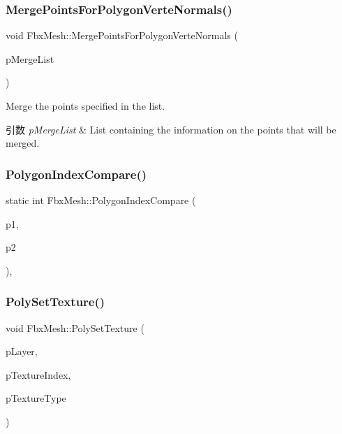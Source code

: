 \subsubsection{\texorpdfstring{Merge\+Points\+For\+Polygon\+Verte\+Normals()}{MergePointsForPolygonVerteNormals()}}
{\footnotesize\ttfamily void Fbx\+Mesh\+::\+Merge\+Points\+For\+Polygon\+Verte\+Normals (\begin{DoxyParamCaption}\item[{\hyperlink{class_fbx_array}{Fbx\+Array}$<$ int $>$ \&}]{p\+Merge\+List }\end{DoxyParamCaption})}

Merge the points specified in the list. 
\begin{DoxyParams}{引数}
{\em p\+Merge\+List} & List containing the information on the points that will be merged. \\
\hline
\end{DoxyParams}
\mbox{\label{class_fbx_mesh_acbc149091e1be99e9555abbd81f03981}} 
\subsubsection{\texorpdfstring{Polygon\+Index\+Compare()}{PolygonIndexCompare()}}
{\footnotesize\ttfamily static int Fbx\+Mesh\+::\+Polygon\+Index\+Compare (\begin{DoxyParamCaption}\item[{const void $\ast$}]{p1,  }\item[{const void $\ast$}]{p2 }\end{DoxyParamCaption})\hspace{0.3cm}{\ttfamily [static]}, {\ttfamily [protected]}}

\mbox{\label{class_fbx_mesh_a9a333d725455805aa0fa2dae26a85929}} 
\subsubsection{\texorpdfstring{Poly\+Set\+Texture()}{PolySetTexture()}}
{\footnotesize\ttfamily void Fbx\+Mesh\+::\+Poly\+Set\+Texture (\begin{DoxyParamCaption}\item[{\hyperlink{class_fbx_layer}{Fbx\+Layer} $\ast$}]{p\+Layer,  }\item[{int}]{p\+Texture\+Index,  }\item[{\hyperlink{class_fbx_layer_element_a8c95c5cd880b56c776acd379bd86f42c}{Fbx\+Layer\+Element\+::\+E\+Type}}]{p\+Texture\+Type }\end{DoxyParamCaption})\hspace{0.3cm}{\ttfamily [protected]}}

